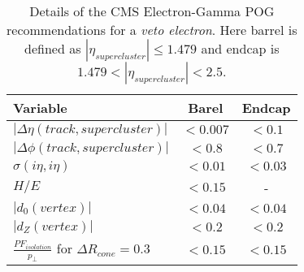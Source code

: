 \begin{table}[!htp]
\centering
\begin{tabular}{|l|c|c|}
\hline
Variable & Barel & Endcap \\
\hline\hline
$| \Delta\eta(track,supercluster) |$ & $<0.007$ & $<0.1$  \\
$| \Delta\phi(track,supercluster) |$ & $<0.8  $ & $<0.7$  \\
$ \sigma(i\eta,i\eta)$               & $<0.01 $ & $<0.03$ \\
$H/E$                                & $<0.15 $ &       - \\
$|d_{0}(vertex)|$                    & $<0.04 $ & $<0.04$ \\
$|d_{Z}(vertex)|$                    & $<0.2  $ & $<0.2 $ \\
$\frac{PF_{isolation}}{p_{\perp}}$ for $ \Delta R_{cone}=0.3$  & $<0.15 $ & $<0.15$ \\
\hline
\end{tabular}
\caption{Details of the \gls{CMS} Electron-Gamma \gls{POG} recommendations for a \textit{veto electron}. Here barrel is defined as $ |\eta_{supercluster}| \leq 1.479 $ and endcap is $ 1.479 < |\eta_{supercluster}| < 2.5 $.} 
\label{TABLE:PhysicsObjects_ElectronPOG_CutBased_VetoElectronRequirements}
\end{table}

